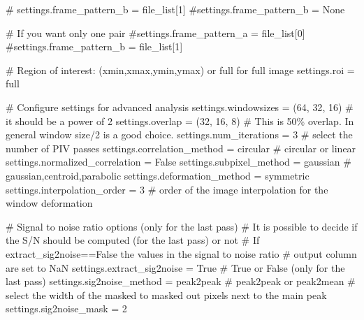\documentclass[
  english,
  letterpaper,
  numbers=noendperiod,
  DIV=13]{scrreprt}
\newenvironment{Shaded}{\begin{snugshade}}{\end{snugshade}}
\newcommand{\CommentTok}[1]{\textcolor[rgb]{0.37,0.37,0.37}{#1}}
\newcommand{\DecValTok}[1]{\textcolor[rgb]{0.68,0.00,0.00}{#1}}
\newcommand{\NormalTok}[1]{\textcolor[rgb]{0.00,0.23,0.31}{#1}}
\newcommand{\OperatorTok}[1]{\textcolor[rgb]{0.37,0.37,0.37}{#1}}
\newcommand{\StringTok}[1]{\textcolor[rgb]{0.13,0.47,0.30}{#1}}
\newcommand{\VariableTok}[1]{\textcolor[rgb]{0.07,0.07,0.07}{#1}}
\begin{document}
\begin{Shaded}
\begin{Highlighting}[]
\CommentTok{\# settings.frame\_pattern\_b = file\_list[1]}
\CommentTok{\#settings.frame\_pattern\_b = None}

\CommentTok{\# If you want only one pair}
\CommentTok{\#settings.frame\_pattern\_a = file\_list[0]}
\CommentTok{\#settings.frame\_pattern\_b = file\_list[1]}


\CommentTok{\# Region of interest: (xmin,xmax,ymin,ymax) or \textquotesingle{}full\textquotesingle{} for full image}
\NormalTok{settings.roi }\OperatorTok{=} \StringTok{\textquotesingle{}full\textquotesingle{}}

\CommentTok{\# Configure settings for advanced analysis}
\NormalTok{settings.windowsizes }\OperatorTok{=}\NormalTok{ (}\DecValTok{64}\NormalTok{, }\DecValTok{32}\NormalTok{, }\DecValTok{16}\NormalTok{) }\CommentTok{\# it should be a power of 2}
\NormalTok{settings.overlap }\OperatorTok{=}\NormalTok{ (}\DecValTok{32}\NormalTok{, }\DecValTok{16}\NormalTok{, }\DecValTok{8}\NormalTok{) }\CommentTok{\# This is 50\% overlap. In general window size/2 is a good choice.}
\NormalTok{settings.num\_iterations }\OperatorTok{=} \DecValTok{3} \CommentTok{\# select the number of PIV passes}
\NormalTok{settings.correlation\_method }\OperatorTok{=} \StringTok{\textquotesingle{}circular\textquotesingle{}} \CommentTok{\# \textquotesingle{}circular\textquotesingle{} or \textquotesingle{}linear\textquotesingle{}}
\NormalTok{settings.normalized\_correlation }\OperatorTok{=} \VariableTok{False}
\NormalTok{settings.subpixel\_method }\OperatorTok{=} \StringTok{\textquotesingle{}gaussian\textquotesingle{}} \CommentTok{\# \textquotesingle{}gaussian\textquotesingle{},\textquotesingle{}centroid\textquotesingle{},\textquotesingle{}parabolic\textquotesingle{}}
\NormalTok{settings.deformation\_method }\OperatorTok{=} \StringTok{\textquotesingle{}symmetric\textquotesingle{}}
\NormalTok{settings.interpolation\_order }\OperatorTok{=} \DecValTok{3} \CommentTok{\# order of the image interpolation for the window deformation}

\CommentTok{\# Signal to noise ratio options (only for the last pass)}
\CommentTok{\# It is possible to decide if the S/N should be computed (for the last pass) or not}
\CommentTok{\# If extract\_sig2noise==False the values in the signal to noise ratio}
\CommentTok{\# output column are set to NaN}
\NormalTok{settings.extract\_sig2noise }\OperatorTok{=} \VariableTok{True}  \CommentTok{\# \textquotesingle{}True\textquotesingle{} or \textquotesingle{}False\textquotesingle{} (only for the last pass)}
\NormalTok{settings.sig2noise\_method }\OperatorTok{=} \StringTok{\textquotesingle{}peak2peak\textquotesingle{}} \CommentTok{\# \textquotesingle{}peak2peak\textquotesingle{} or \textquotesingle{}peak2mean\textquotesingle{}}
\CommentTok{\# select the width of the masked to masked out pixels next to the main peak}
\NormalTok{settings.sig2noise\_mask }\OperatorTok{=} \DecValTok{2}


\end{Highlighting}
\end{Shaded}
\end{document}

